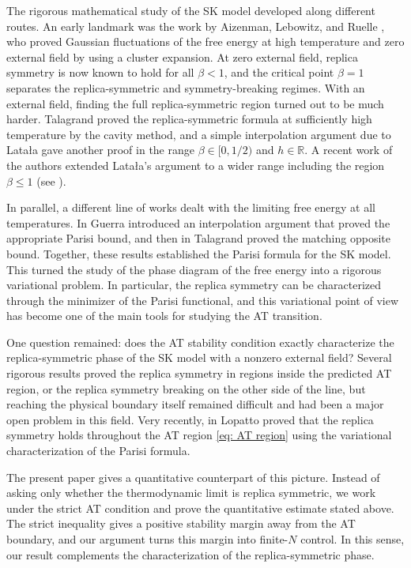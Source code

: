\documentclass[11pt]{article}
\numberwithin{equation}{section}
\newcommand{\R}{\mathbb{R}}
\newcommand{\1}{\mathbf 1}
\begin{document}
The rigorous mathematical study of the SK model developed along different routes. An early landmark was the work by Aizenman, Lebowitz, and Ruelle \cite{AizenmanLebowitzRuelle1987}, who proved Gaussian fluctuations of the free energy at high temperature and zero external field by using a cluster expansion. At zero external field, replica symmetry is now known to hold for all $\beta<1$, and the critical point $\beta=1$ separates the replica-symmetric and symmetry-breaking regimes. With an external field, finding the full replica-symmetric region turned out to be much harder. Talagrand  proved the replica-symmetric formula at sufficiently high temperature by the cavity method, and a simple interpolation argument due to Lata\l{}a gave another proof in the range $\beta \in [0,1/2)$ and $h\in \R$. A recent work of the authors extended Lata\l{}a's argument to a wider range including the region $\beta\leq 1$ (see \cite{KusuokaNakajima1}).

In parallel, a different line of works dealt with the limiting free energy at all temperatures. In \cite{Guerra} Guerra introduced an interpolation argument that proved the appropriate Parisi bound, and then in \cite{TalagrandParisi} Talagrand proved the matching opposite bound. Together, these results established the Parisi formula for the SK model. This turned the study of the phase diagram of the free energy into a rigorous variational problem. In particular, the replica symmetry can be characterized through the minimizer of the Parisi functional, and this variational point of view has become one of the main tools for studying the AT transition.

One question remained: does the AT stability condition exactly characterize the replica-symmetric phase of the SK model with a nonzero external field? Several rigorous results proved the replica symmetry in regions inside the predicted AT region, or the replica symmetry breaking on the other side of the line, but reaching the physical boundary itself remained difficult and had been a major open problem in this field. Very recently, in \cite{Lopatto} Lopatto proved that the replica symmetry holds throughout the AT region \eqref{eq: AT region} 
 using the variational characterization of the Parisi formula. 

The present paper gives a quantitative counterpart of this picture. Instead of asking only whether the thermodynamic limit is replica symmetric, we work under the strict AT condition
 and prove the quantitative estimate stated above. The strict inequality gives a positive stability margin away from the AT boundary, and our argument turns this margin into finite-$N$ control. In this sense, our result complements the characterization of the replica-symmetric phase. 
\end{document}
